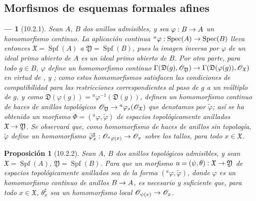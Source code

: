 \documentclass[oneside]{amsart}
\theoremstyle{ega-env-style}
\newtheorem*{env}{---}
\theoremstyle{ega-thm-env-style}
\newtheorem*{proposition}{Proposición}
\theoremstyle{ega-defn-env-style}
\renewcommand{\to}{\mathchoice{\longrightarrow}{\rightarrow}{\rightarrow}{\rightarrow}}
\let\EGAOriginalLabel\label
\renewcommand{\label}[1]{\phantomsection\EGAOriginalLabel{#1}}
\begin{document}
\subsection{Morfismos de esquemas formales afines}
\label{subsection:I.10.2}

\begin{env}[10.2.1]
\label{I.10.2.1}
Sean $A$, $B$ dos anillos admisibles, y sea $\varphi:B\to A$ un homomorfismo \emph{continuo}.
La aplicación continua $ {}^a\varphi:\operatorname{Spec}(A)\to\operatorname{Spec}(B)$  lleva entonces $\mathfrak{X}=\operatorname{Spf}(A)$ a $\mathfrak{Y}=\operatorname{Spf}(B)$, pues la imagen inversa por $\varphi$ de un ideal primo abierto de $A$ es un ideal primo abierto de $B$.
Por otra parte, para todo $g\in B$,
$\varphi$ define un homomorfismo continuo
$\Gamma(\mathfrak{D}(g),\mathscr{O}_{\mathfrak{Y}})\to
\Gamma(\mathfrak{D}(\varphi(g)),\mathscr{O}_{\mathfrak{X}})$
en virtud de ,
y ; como estos homomorfismos satisfacen las condiciones de compatibilidad para las restricciones correspondientes al paso de $g$ a un múltiplo de $g$, y como $\mathfrak{D}(\varphi(g))={}^a\varphi^{-1}(\mathfrak{D}(g))$, definen un homomorfismo \emph{continuo} de haces de anillos topológicos $\mathscr{O}_{\mathfrak{Y}}\to
{}^a\varphi_*(\mathscr{O}_{\mathfrak{X}})$  que denotamos por $\widetilde{\varphi}$; así se ha obtenido un morfismo $\Phi=({}^a\varphi,\widetilde{\varphi})$ de espacios topológicamente anillados $\mathfrak{X}\to\mathfrak{Y}$.
Se observará que, como homomorfismo de haces de anillos sin topología, $\widetilde{\varphi}$ define un homomorfismo $\widetilde{\varphi}_x^\sharp:
\mathscr{O}_{{}^a\varphi(x)}\to\mathscr{O}_x$ sobre los tallos, para todo $x\in\mathfrak{X}$.
\end{env}

\begin{proposition}[10.2.2]
\label{I.10.2.2}
Sean $A$, $B$ dos anillos topológicos admisibles, y sean $\mathfrak{X}=\operatorname{Spf}(A)$, $\mathfrak{Y}=\operatorname{Spf}(B)$. Para que un morfismo $u=(\psi,\theta):\mathfrak{X}\to\mathfrak{Y}$ de espacios topológicamente anillados sea de la forma $({}^a\varphi,\widetilde{\varphi})$, donde $\varphi$ es un homomorfismo continuo de anillos $B\to A$, es necesario y suficiente que, para todo $x\in\mathfrak{X}$, $\theta_x^\sharp$ sea un homomorfismo local $\mathscr{O}_{\psi(x)}\to\mathscr{O}_x$.
\end{proposition}
\end{document}
